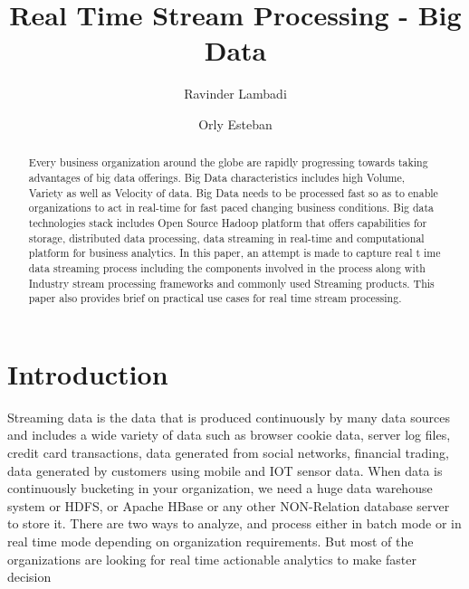 
\title{Real Time Stream Processing - Big Data}

\author{Ravinder Lambadi}


\author{Orly Esteban}


\begin{abstract}
  Every business organization around the globe are rapidly progressing
  towards taking advantages of big data offerings.  Big Data
  characteristics includes high Volume, Variety as well as Velocity of
  data.  Big Data needs to be processed fast so as to enable
  organizations to act in real-time for fast paced changing business
  conditions.  Big data technologies stack includes Open Source Hadoop
  platform that offers capabilities for storage, distributed data
  processing, data streaming in real-time and computational platform
  for business analytics.  In this paper, an attempt is made to
  capture real t ime data streaming process including the components
  involved in the process along with Industry stream processing
  frameworks and commonly used Streaming products.  This paper also
  provides brief on practical use cases for real time stream
  processing.

\end{abstract}


\maketitle

\section{Introduction}

Streaming data is the data that is produced continuously by many data
sources and includes a wide variety of data such as browser cookie
data, server log files, credit card transactions, data generated from
social networks, financial trading, data generated by customers using
mobile and IOT sensor data.  When data is continuously bucketing in
your organization, we need a huge data warehouse system or HDFS, or
Apache HBase or any other NON-Relation database server to store it.
There are two ways to analyze, and process either in batch mode or in
real time mode depending on organization requirements.  But most of
the organizations are looking for real time actionable analytics to
make faster decision
 
